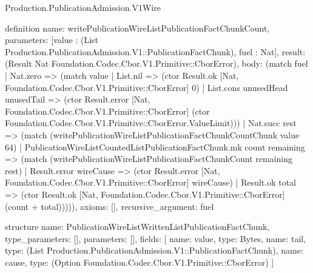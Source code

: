 \begin{lexlean}{Production.PublicationAdmission.V1Wire}
\begin{semanticmodule}
definition{
  name: writePublicationWireListPublicationFactChunkCount,
  parameters: [value : (List Production.PublicationAdmission.V1::PublicationFactChunk), fuel : Nat],
  result: (Result Nat Foundation.Codec.Cbor.V1.Primitive::CborError),
  body: (match fuel
    | Nat.zero => (match value
      | List.nil => (ctor Result.ok [Nat, Foundation.Codec.Cbor.V1.Primitive::CborError] 0)
      | List.cons unusedHead unusedTail => (ctor Result.error [Nat, Foundation.Codec.Cbor.V1.Primitive::CborError] (ctor Foundation.Codec.Cbor.V1.Primitive::CborError.ValueLimit)))
    | Nat.succ rest => (match (writePublicationWireListPublicationFactChunkCountChunk value 64)
      | PublicationWireListCountedListPublicationFactChunk.mk count remaining => (match (writePublicationWireListPublicationFactChunkCount remaining rest)
        | Result.error wireCause => (ctor Result.error [Nat, Foundation.Codec.Cbor.V1.Primitive::CborError] wireCause)
        | Result.ok total => (ctor Result.ok [Nat, Foundation.Codec.Cbor.V1.Primitive::CborError] (count + total))))),
  axioms: [],
  recursive_argument: fuel
}

structure{
  name: PublicationWireListWrittenListPublicationFactChunk,
  type_parameters: [],
  parameters: [],
  fields: [
    {name: value, type: Bytes},
    {name: tail, type: (List Production.PublicationAdmission.V1::PublicationFactChunk)},
    {name: cause, type: (Option Foundation.Codec.Cbor.V1.Primitive::CborError)}
  ]
}


\end{semanticmodule}
\end{lexlean}

